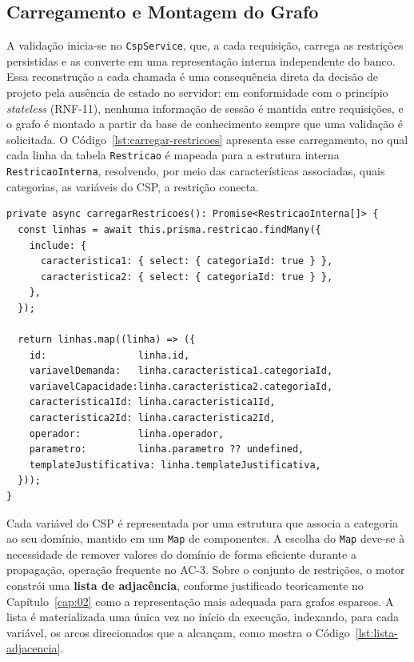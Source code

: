 \subsection{Carregamento e Montagem do Grafo}
\label{sub:montagem-grafo}
A validação inicia-se no \texttt{CspService}, que, a cada requisição, carrega as restrições persistidas e as converte em uma representação interna independente do banco. Essa reconstrução a cada chamada é uma consequência direta da decisão de projeto pela ausência de estado no servidor: em conformidade com o princípio \textit{stateless} (RNF-11), nenhuma informação de sessão é mantida entre requisições, e o grafo é montado a partir da base de conhecimento sempre que uma validação é solicitada. O Código~\ref{lst:carregar-restricoes} apresenta esse carregamento, no qual cada linha da tabela \texttt{Restricao} é mapeada para a estrutura interna \texttt{RestricaoInterna}, resolvendo, por meio das características associadas, quais categorias, as variáveis do CSP, a restrição conecta.

\begin{lstlisting}[caption={Carregamento das restrições a partir da base de conhecimento},label={lst:carregar-restricoes},basicstyle=\ttfamily\small]
private async carregarRestricoes(): Promise<RestricaoInterna[]> {
  const linhas = await this.prisma.restricao.findMany({
    include: {
      caracteristica1: { select: { categoriaId: true } },
      caracteristica2: { select: { categoriaId: true } },
    },
  });

  return linhas.map((linha) => ({
    id:                linha.id,
    variavelDemanda:   linha.caracteristica1.categoriaId,
    variavelCapacidade:linha.caracteristica2.categoriaId,
    caracteristica1Id: linha.caracteristica1Id,
    caracteristica2Id: linha.caracteristica2Id,
    operador:          linha.operador,
    parametro:         linha.parametro ?? undefined,
    templateJustificativa: linha.templateJustificativa,
  }));
}
\end{lstlisting}

Cada variável do CSP é representada por uma estrutura que associa a categoria ao seu domínio, mantido em um \texttt{Map} de componentes. A escolha do \texttt{Map} deve-se à necessidade de remover valores do domínio de forma eficiente durante a propagação, operação frequente no AC-3. Sobre o conjunto de restrições, o motor constrói uma \textbf{lista de adjacência}, conforme justificado teoricamente no Capítulo~\ref{cap:02} como a representação mais adequada para grafos esparsos. A lista é materializada uma única vez no início da execução, indexando, para cada variável, os arcos direcionados que a alcançam, como mostra o Código~\ref{lst:lista-adjacencia}.

